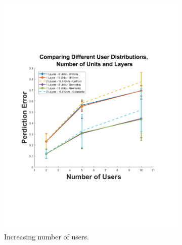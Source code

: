 	\begin{figure}
	\centering
	\begin{subfigure}[b]{0.45\textwidth}
		\includegraphics[width=\textwidth]{./img/users4}
		\caption{Increasing number of users.}
		\label{fig:user}
	\end{subfigure}
	~ %
	\begin{subfigure}[b]{0.45\textwidth}

\end{subfigure}
\end{figure}
